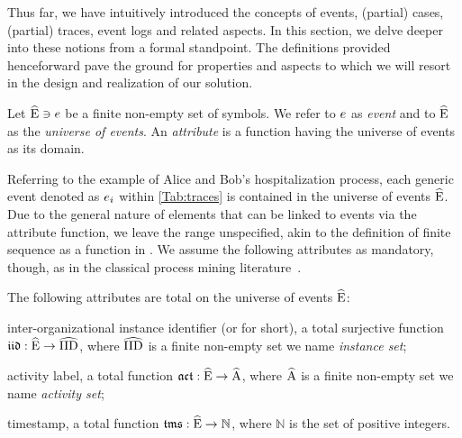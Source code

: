 \begin{newj}
Thus far, we have intuitively introduced the concepts of events, (partial) cases, (partial) traces, event logs and related aspects.
In this section, we delve deeper into these notions from a formal standpoint. The definitions provided henceforward pave the ground for properties and aspects to which we will resort in the design and realization of our solution.

\begin{definition}[Event]\label{def:evt}
	Let $\widehat{\mathrm{E}} \ni e$ be a finite non-empty set of symbols. We refer to $e$ as \emph{event} and to $\widehat{\mathrm{E}}$ as the \emph{universe of events}.
	An \emph{attribute} is a function having the universe of events as its domain.
\end{definition}
%
Referring to the example of Alice and Bob's hospitalization process, each generic event denoted as $e_i$ within \cref{Tab:traces} is contained in the universe of events $\widehat{\mathrm{E}}$. Due to the general nature of elements that can be linked to events via the attribute function, we leave the range unspecified, akin to the definition of finite sequence as a function in \cite{Mendelson/2015:IntroductionMathematicalLogic}. We assume the following attributes as mandatory, though, as in the classical process mining literature~\cite{Aalst/2016:ProcessMiningBook:DataScienceinAction}. 
%
\begin{assumption}\label{asm:attribute}
	The following attributes are total on the universe of events $\widehat{\mathrm{E}}$:
	\begin{inparadesc}
		\item[inter-organizational instance identifier] (or {\CId} for short), a total surjective function $\mathfrak{iid} : \widehat{\mathrm{E}} \to \widehat{\mathrm{IID}}$, where $\widehat{\mathrm{IID}}$ is a finite non-empty set we name \emph{instance set};
		\item[activity label\textnormal{,}] a total function $\mathfrak{act} : \widehat{\mathrm{E}} \to \widehat{\mathrm{A}}$, where $\widehat{\mathrm{A}}$ is a finite non-empty set we name \emph{activity set};
		\item[timestamp\textnormal{,}] a total function $\mathfrak{tms} : \widehat{\mathrm{E}} \to \mathbb{N}$, where $\mathbb{N}$ is the set of positive integers.
	\end{inparadesc}
\end{assumption}

\end{newj}
